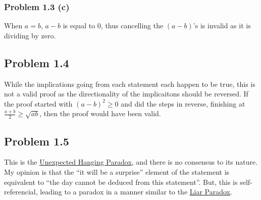 \documentclass{article}
\begin{document}
\subsubsection{Problem 1.3 (c)}
When $a=b$, $a-b$ is equal to $0$, thus cancelling the $(a-b)$'s is invalid as it is dividing by zero.
\subsection{Problem 1.4}
While the implications going from each statement each happen to be true, this is not a valid proof as the directionality of the implicaitons should be reversed. If the proof started with $(a-b)^2 \ge 0$ and did the steps in reverse, finishing at $\frac{a+b}{2} \ge \sqrt{ab}$, then the proof would have been valid.
\subsection{Problem 1.5}
This is the \href{https://en.wikipedia.org/wiki/Unexpected_hanging_paradox}{Unexpected Hanging Paradox}, and there is no consensus to its nature. My opinion is that the ``it will be a surprise'' element of the statement is equivalent to ``the day cannot be deduced from this statement''. But, this is self-referencial, leading to a paradox in a manner similar to the \href{https://en.wikipedia.org/wiki/Liar_paradox}{Liar Paradox}.
\end{document}
